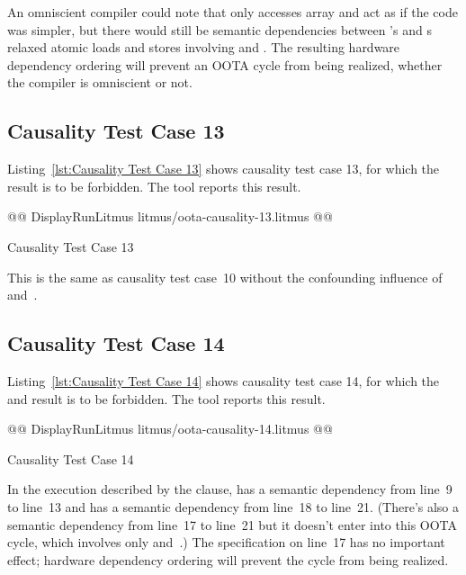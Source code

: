 \documentclass[10]{article}
\begin{document}
An omniscient compiler could note that only  accesses
array  and act as if the code was simpler, but there would
still be semantic dependencies between 's and s
relaxed atomic loads and stores involving  and .
The resulting hardware dependency ordering will prevent an OOTA cycle
from being realized, whether the compiler is omniscient or not.

\subsection{Causality Test Case 13}
\label{app:Causality Test Case 13}

Listing~\ref{lst:Causality Test Case 13}
shows causality test case 13, for which the 
result is to be forbidden.
The  tool reports this result.

\begin{listing}[tbp]
@@ DisplayRunLitmus litmus/oota-causality-13.litmus @@
\caption{Causality Test Case 13}
\label{lst:Causality Test Case 13}
\end{listing}

This is the same as causality test case~10 without the confounding
influence of  and~.

\subsection{Causality Test Case 14}
\label{app:Causality Test Case 14}

Listing~\ref{lst:Causality Test Case 14}
shows causality test case 14, for which the  and 
result is to be forbidden.
The  tool reports this result.

\begin{listing}[tbp]
@@ DisplayRunLitmus litmus/oota-causality-14.litmus @@
\caption{Causality Test Case 14}
\label{lst:Causality Test Case 14}
\end{listing}

In the execution described by the  clause,
 has a semantic dependency from line~9 to
line~13 and  has a semantic dependency from line~18 to
line~21.
(There's also a semantic dependency from line~17 to line~21 but it
doesn't enter into this OOTA cycle, which involves only  and~.)
The  specification on line~17 has no important effect;
hardware dependency ordering will prevent the cycle from being realized.
\end{document}
